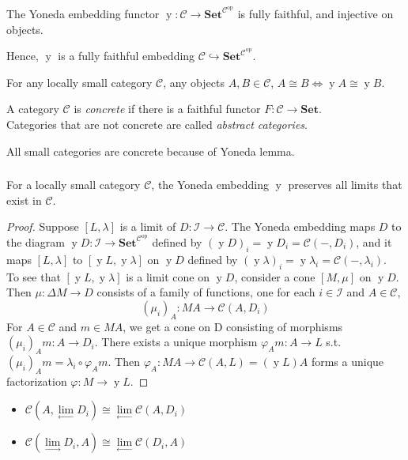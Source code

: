 \documentclass[UTF8,aspectratio=43,11pt,colorlinks,compress,openany]{beamer}%
\begin{document}
\begin{frame}\frametitle{}
\begin{corollary}
	The Yoneda embedding functor $\operatorname{y}:\mathcal{C}\to\mathbf{Set}^{\mathcal{C}^\mathrm{op}}$ is fully faithful, and injective on objects.
\end{corollary}
Hence, $\operatorname{y}$ is a fully faithful embedding $\mathcal{C}\hookrightarrow\mathbf{Set}^{\mathcal{C}^\mathrm{op}}$.
\begin{corollary}
	For any locally small category $\mathcal{C}$, any objects $A,B\in\mathcal{C}$, $A\cong B\iff \operatorname{y}A\cong\operatorname{y}B$. 
\end{corollary}
\begin{definition}
	A category $\mathcal{C}$ is \emph{concrete} if there is a faithful functor $F:\mathcal{C}\to\mathbf{Set}$.\\
	Categories that are not concrete are called \emph{abstract categories}.
\end{definition}
All small categories are concrete because of Yoneda lemma.
\end{frame}

\begin{frame}\frametitle{}
\begin{theorem}
For a locally small category $\mathcal{C}$, the Yoneda embedding $\operatorname{y}$
preserves all limits that exist in $\mathcal{C}$.
\end{theorem}
\begin{proof}
Suppose $[L,\lambda]$ is a limit of $D:\mathcal{I}\to\mathcal{C}$. The Yoneda embedding maps $D$ to the
diagram $\operatorname{y}D:\mathcal{I}\to\mathbf{Set}^{\mathcal{C}^\mathrm{op}}$ defined by $(\operatorname{y}D)_i=\operatorname{y}D_i=\mathcal{C}(-,D_i)$, and it maps $[L,\lambda]$ to $[\operatorname{y}L,\operatorname{y}\lambda]$ on $\operatorname{y}D$ defined by $(\operatorname{y}\lambda)_i=\operatorname{y}\lambda_i=\mathcal{C}(-,\lambda_i)$.\\
To see that $[\operatorname{y}L,\operatorname{y}\lambda]$ is a limit cone on $\operatorname{y}D$, consider a cone $[M,\mu]$ on $\operatorname{y}D$. Then $\mu:\Delta M\to D$ consists of a family of functions, one for each $i\in\mathcal{I}$ and $A\in\mathcal{C}$,
\[(\mu_i)_A: MA\to\mathcal{C}(A,D_i)\]
For $A\in\mathcal{C}$ and $m\in MA$, we get a cone on D consisting of morphisms $(\mu_i)_Am: A\to D_i$. There exists a unique morphism $\varphi_Am: A\to L$ s.t. $(\mu_i)_Am=\lambda_i\circ\varphi_Am$. Then $\varphi_A: MA\to \mathcal{C}(A,L)=(\operatorname{y}L)A$ forms a unique factorization $\varphi: M\to\operatorname{y}L$.
\end{proof}
\begin{itemize}
	\item $\mathcal{C}(A,\lim\limits_\gets D_i)\cong\lim\limits_\gets\mathcal{C}(A,D_i)$
	\item $\mathcal{C}(\lim\limits_\to D_i,A)\cong\lim\limits_\gets\mathcal{C}(D_i,A)$
\end{itemize}
\end{frame}
\end{document}
